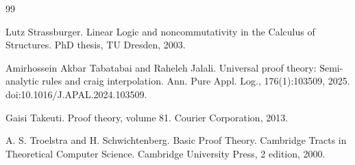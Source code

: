 \begin{thebibliography}{99}
\par\noindent    Lutz Strassburger.  Linear Logic and noncommutativity in the Calculus of Structures.  PhD thesis, TU Dresden, 2003.  

\par\noindent    Amirhossein Akbar Tabatabai and Raheleh Jalali.  Universal proof theory: Semi-analytic rules and craig interpolation.  Ann. Pure Appl. Log., 176(1):103509, 2025.  doi:10.1016/J.APAL.2024.103509.  

\par\noindent    Gaisi Takeuti.  Proof theory, volume 81.  Courier Corporation, 2013.  

\par\noindent    A. S. Troelstra and H. Schwichtenberg.  Basic Proof Theory.  Cambridge Tracts in Theoretical Computer Science. Cambridge University Press, 2 edition, 2000.  

\end{thebibliography}

